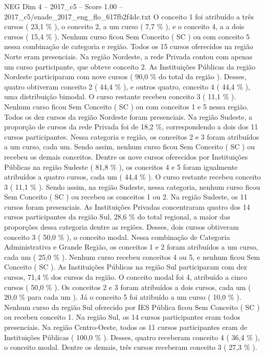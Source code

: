 \begin{textsample}{NEG Dim 4 – 2017\_c5 – Score 1.00 – 2017\_c5/enade\_2017\_eng\_flo\_617fb2f4dc.txt}
O conceito 1 foi atribuído a três cursos ( 23,1 \% ), o conceito 2, a um curso ( 7,7 \% ), e o conceito 4, a a dois cursos ( 15,4 \% ).
Nenhum curso ficou Sem Conceito ( SC ) ou com conceito 5 nessa combinação de categoria e região.
Todos os 15 cursos oferecidos na região Norte eram presenciais.
Na região Nordeste, a rede Privada contou com apenas um curso participante, que obteve conceito 2.
As Instituições Públicas da região Nordeste participaram com nove cursos ( 90,0 \% do total da região ).
Desses, quatro obtiveram conceito 2 ( 44,4 \% ), e outros quatro, conceito 4 ( 44,4 \% ), uma distribuição bimodal.
O curso restante recebeu conceito 3 ( 11,1 \% ).
Nenhum curso ficou Sem Conceito ( SC ) ou com conceitos 1 e 5 nessa região.
Todos os dez cursos da região Nordeste foram presenciais.
Na região Sudeste, a proporção de cursos da rede Privada foi de 18,2 \%, correspondendo a dois dos 11 cursos participantes.
Nessa categoria e região, os conceitos 2 e 3 foram atribuídos a um curso, cada um.
Sendo assim, nenhum curso ficou Sem Conceito ( SC ) ou recebeu os demais conceitos.
Dentre os nove cursos oferecidos por Instituições Públicas na região Sudeste ( 81,8 \% ), os conceitos 4 e 5 foram igualmente atribuídos a quatro cursos, cada um ( 44,4 \% ).
O curso restante recebeu conceito 3 ( 11,1 \% ).
Sendo assim, na região Sudeste, nessa categoria, nenhum curso ficou Sem Conceito ( SC ) ou recebeu os conceitos 1 ou 2.
Na região Sudeste, os 11 cursos foram presenciais.
As Instituições Privadas concentraram quatro dos 14 cursos participantes da região Sul, 28,6 \% do total regional, a maior das proporções dessa categoria dentre as regiões.
Desses, dois cursos obtiveram conceito 3 ( 50,0 \% ), o conceito modal.
Nessa combinação de Categoria Administrativa e Grande Região, os conceitos 1 e 2 foram atribuídos a um curso, cada um ( 25,0 \% ).
Nenhum curso recebeu conceitos 4 ou 5, e nenhum ficou Sem Conceito ( SC ).
As Instituições Públicas na região Sul participaram com dez cursos, 71,4 \% dos cursos da região.
O conceito modal foi 4, atribuído a cinco cursos ( 50,0 \% ).
Os conceitos 2 e 3 foram atribuídos a dois cursos, cada um ( 20,0 \% para cada um ).
Já o conceito 5 foi atribuído a um curso ( 10,0 \% ).
Nenhum curso da região Sul oferecido por IES Pública ficou Sem Conceito ( SC ) ou recebeu conceito 1.
Na região Sul, os 14 cursos participantes eram todos presenciais.
Na região Centro-Oeste, todos os 11 cursos participantes eram de Instituições Públicas ( 100,0 \% ).
Desses, quatro receberam conceito 4 ( 36,4 \% ), o conceito modal.
Dentre os demais, três cursos receberam conceito 3 ( 27,3 \% ).

\end{textsample}
